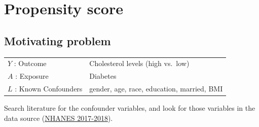 \documentclass[
]{book}
\newenvironment{Shaded}{\begin{snugshade}}{\end{snugshade}}
\newcommand{\AttributeTok}[1]{\textcolor[rgb]{0.77,0.63,0.00}{#1}}
\newcommand{\CommentTok}[1]{\textcolor[rgb]{0.56,0.35,0.01}{\textit{#1}}}
\newcommand{\DecValTok}[1]{\textcolor[rgb]{0.00,0.00,0.81}{#1}}
\newcommand{\FunctionTok}[1]{\textcolor[rgb]{0.00,0.00,0.00}{#1}}
\newcommand{\NormalTok}[1]{#1}
\newcommand{\OtherTok}[1]{\textcolor[rgb]{0.56,0.35,0.01}{#1}}
\newcommand{\SpecialCharTok}[1]{\textcolor[rgb]{0.00,0.00,0.00}{#1}}
\newcommand{\StringTok}[1]{\textcolor[rgb]{0.31,0.60,0.02}{#1}}
\begin{document}
\hypertarget{ps}{%
\chapter{Propensity score}\label{ps}}

\hypertarget{motivating-problem}{%
\section{Motivating problem}\label{motivating-problem}}

\begin{longtable}[]{@{}ll@{}}
\toprule
\endhead
\(Y\) : Outcome & Cholesterol levels (high vs.~low)\tabularnewline
\(A\) : Exposure & Diabetes\tabularnewline
\(L\) : Known Confounders & gender, age, race, education, married, BMI\tabularnewline
\bottomrule
\end{longtable}

Search literature for the confounder variables, and look for those variables in the data source (\href{https://wwwn.cdc.gov/nchs/nhanes/continuousnhanes/default.aspx?BeginYear=2017}{NHANES 2017-2018}).

\begin{Shaded}
\end{Shaded}
\end{document}
